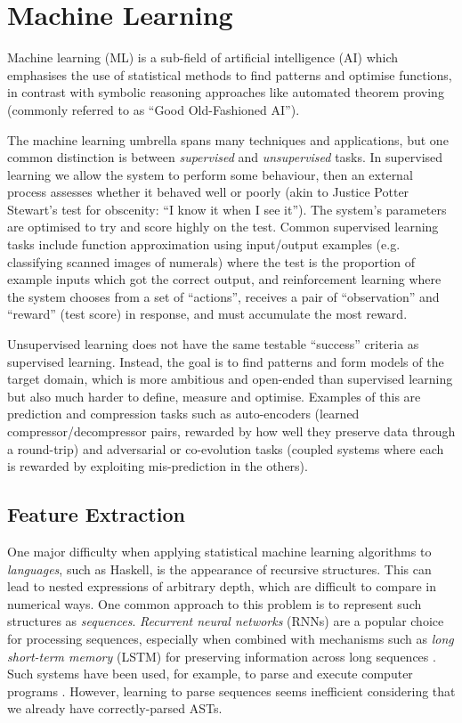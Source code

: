 \section{Machine Learning}

Machine learning (ML) is a sub-field of artificial intelligence (AI) which
emphasises the use of statistical methods to find patterns and optimise
functions, in contrast with symbolic reasoning approaches like automated theorem
proving (commonly referred to as ``Good Old-Fashioned AI'').

The machine learning umbrella spans many techniques and applications, but one
common distinction is between \emph{supervised} and \emph{unsupervised} tasks.
In supervised learning we allow the system to perform some behaviour, then an
external process assesses whether it behaved well or poorly (akin to Justice
Potter Stewart's test for obscenity: ``I know it when I see it''). The system's
parameters are optimised to try and score highly on the test. Common supervised
learning tasks include function approximation using input/output examples (e.g.
classifying scanned images of numerals) where the test is the proportion of
example inputs which got the correct output, and reinforcement learning where
the system chooses from a set of ``actions'', receives a pair of ``observation''
and ``reward'' (test score) in response, and must accumulate the most reward.

Unsupervised learning does not have the same testable ``success'' criteria as
supervised learning. Instead, the goal is to find patterns and form models of
the target domain, which is more ambitious and open-ended than supervised
learning but also much harder to define, measure and optimise. Examples of this
are prediction and compression tasks such as auto-encoders
(learned compressor/decompressor pairs, rewarded by how well they preserve data
through a round-trip) and adversarial or co-evolution tasks (coupled systems
where each is rewarded by exploiting mis-prediction in the others).

\subsection{Feature Extraction}

One major difficulty when applying statistical machine learning algorithms to
\emph{languages}, such as Haskell, is the appearance of recursive
structures. This can lead to nested expressions of arbitrary depth, which are
difficult to compare in numerical ways. One common approach to this problem is
to represent such structures as \emph{sequences}. \emph{Recurrent neural
  networks} (RNNs) are a popular choice for processing sequences, especially
when combined with mechanisms such as \emph{long short-term memory} (LSTM) for
preserving information across long sequences \cite{hochreiter1997long}. Such
systems have been used, for example, to parse and execute computer programs
\cite{zaremba2014learning}. However, learning to parse sequences seems
inefficient considering that we already have correctly-parsed ASTs.

